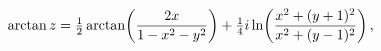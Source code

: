\[\mathop{\mathrm{arctan}\/}\nolimits z=\tfrac{1}{2}\mathop{\mathrm{arctan}\/}%
\nolimits\!\left(\frac{2x}{1-x^{2}-y^{2}}\right)+\tfrac{1}{4}i\mathop{\ln\/}%
\nolimits\!\left(\frac{x^{2}+(y+1)^{2}}{x^{2}+(y-1)^{2}}\right),\]